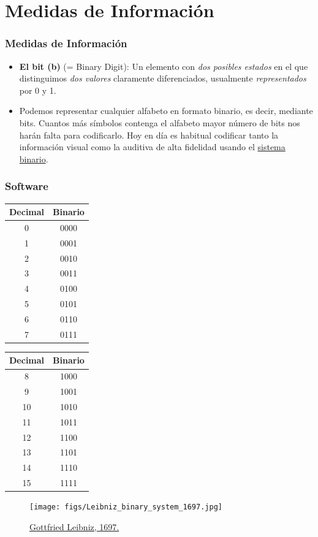 \documentclass[aspectratio=169]{beamer}
\begin{document}
\section{Medidas de Información}
\begin{frame}[fragile]\frametitle{Medidas de Información}
\begin{itemize}
\item \textbf{El bit (b)} (= Binary Digit): Un elemento con \emph{dos posibles estados} en el que distinguimos \emph{dos valores} claramente diferenciados, usualmente \textit{representados} por 0 y 1.
\item Podemos representar cualquier alfabeto en formato binario, es decir, mediante bits. Cuantos más símbolos contenga el alfabeto mayor número de bits nos harán falta para codificarlo. Hoy en día es habitual codificar tanto la información visual como la auditiva de alta fidelidad usando el \href{https://es.wikipedia.org/wiki/Sistema_binario}{sistema binario}.
\end{itemize}
\end{frame}


\begin{frame}[fragile]\frametitle{Software}

\begin{minipage}{4cm}
\begin{tabular}{c|c}
Decimal& Binario \\ \hline
0	& 0000 \\
1	& 0001 \\
2	& 0010 \\
3	& 0011 \\
4	& 0100 \\
5	& 0101 \\
6	& 0110 \\
7	& 0111
\end{tabular}
\end{minipage}
\begin{minipage}{4cm}
\begin{tabular}{c|c}
Decimal& Binario  \\ \hline
8	& 1000 \\
9	& 1001 \\
10	& 1010 \\
11	& 1011 \\
12	& 1100 \\
13	& 1101 \\
14	& 1110 \\
15	& 1111
\end{tabular}
\end{minipage}
\hfill
\begin{minipage}{5cm}
\begin{figure}
\texttt{[image: figs/Leibniz\_binary\_system\_1697.jpg]}
\caption{\href{https://es.wikipedia.org/wiki/Gottfried_Leibniz}{Gottfried Leibniz, 1697.}}
\end{figure}
\end{minipage}
\end{frame}
\end{document}
